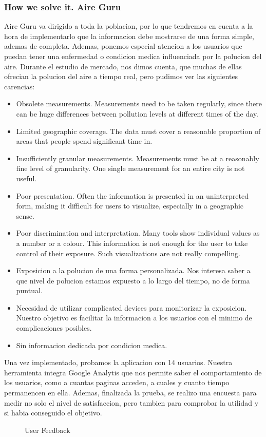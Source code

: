 \subsubsection{How we solve it. Aire Guru} 
Aire Guru va dirigido a toda la poblacion, por lo que tendremos en cuenta a la hora de implementarlo que la informacion debe
mostrarse de una forma simple, ademas de completa. Ademas, ponemos especial atencion a los usuarios que puedan tener una
enfermedad o condicion medica influenciada por la polucion del aire.
Durante el estudio de mercado, nos dimos cuenta, que muchas de ellas ofrecian la polucion del aire a tiempo real, pero 
pudimos ver las siguientes carencias:
\begin{itemize}
    \item Obsolete measurements. Measurements need to be taken regularly, since there can be huge differences
    between pollution levels at different times of the day.
    \item Limited geographic coverage. The data must cover a reasonable proportion of areas that people spend significant time in.
    \item Insufficiently granular measurements. Measurements must be at a reasonably fine level of granularity. One single measurement for an entire city is not useful.
    \item Poor presentation. Often the information is presented in an uninterpreted form, making it difficult for users to visualize, especially in a geographic sense.
    \item Poor discrimination and interpretation. Many tools show individual values as a number or a colour. This information is not
    enough for the user to take control of their exposure. Such visualizations are not really compelling. 
    \item Exposicion a la polucion de una forma personalizada. Nos interesa saber a que nivel de polucion estamos expuesto
    a lo largo del tiempo, no de forma puntual.
    \item Necesidad de utilizar complicated devices para monitorizar la exposicion. Nuestro objetivo es facilitar la informacion a los 
    usuarios con el minimo de complicaciones posibles.
    \item Sin informacion dedicada por condicion medica. 
\end{itemize}

Una vez implementado, probamos la aplicacion con 14 usuarios. Nuestra herramienta integra Google Analytis que nos permite saber el 
comportamiento de los usuarios, como a cuantas paginas acceden, a cuales y cuanto tiempo permanencen en ella. Ademas, finalizada la prueba,
se realizo una encuesta para medir no solo el nivel de satisfaccion, pero tambien para comprobar la utilidad y si habia conseguido el objetivo.
\begin{figure}[ht]
    \centering
    \hfill
  
  \caption{User Feedback}
    \end{figure}
 
